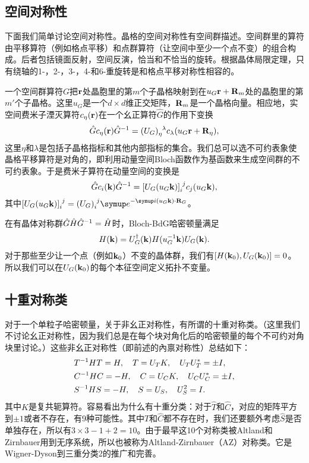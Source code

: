 \subsection{空间对称性}
下面我们简单讨论空间对称性。晶格的空间对称性有空间群描述。空间群里的算符由平移算符（例如格点平移）和点群算符（让空间中至少一个点不变）的组合构成。后者包括镜面反射，空间反演，恰当和不恰当的旋转。根据晶体局限定理，只有绕轴的1-，2-，3-，4-和6-重旋转是和格点平移对称性相容的。

一个空间群算符$G$把$\vb r$处晶胞里的第$m$个子晶格映射到在$u_G \vb r+\vb R_m$处的晶胞里的第$m'$个子晶格。这里$u_G$是一个$d\times d$维正交矩阵，$\vb R_m$是一个晶格向量。相应地，实空间费米子湮灭算符$c_\eta(\vb r)$在一个幺正算符$\hat G$的作用下变换
\begin{equation}
  \hat G c_\eta (\vb r) \hat G\inv = (U_G)\indices{_\eta^\lambda}c_\lambda(u_G \vb r+\vb R_\eta),
\end{equation}
这里$\eta$和$\lambda$是包括子晶格指标和其他内部指标的集合。我们总可以选不可约表象使晶格平移算符是对角的，即利用动量空间Bloch函数作为基函数来生成空间群的不可约表象。于是费米子算符在动量空间的变换是
\begin{equation}
  \hat G c_i(\vb k) \hat G\inv = [U_G(u_G\vb k)]\indices{_i^j}c_j(u_G \vb k),
\end{equation}
其中$[U_G(u_G\vb k)]\indices{_i^j}=(U_G)\indices{_i^j}\eu^{-\iu (u_G\vb k)\cdot \vb R_G}$。

在有晶体对称群$\hat G \hat H \hat G^{-1} = \hat H$时，Bloch-BdG哈密顿量满足
\begin{equation}
  H(\vb k) = U_G^\dagger (\vb k) H(u_G^{-1} \vb k) U_G (\vb k).
\end{equation}
对于那些至少让一个点（例如$\vb k_0$）不变的晶体群，我们有$[H(\vb k_0),U_G(\vb k_0)]=0$。所以我们可以在$U_G(\vb k_0)$的每个本征空间定义拓扑不变量。

\subsection{十重对称类}
对于一个单粒子哈密顿量，关于非幺正对称性，有所谓的十重对称类。（这里我们不讨论幺正对称性，因为我们总是在每个块对角化后的哈密顿量的每个不可约对角块里讨论。）这些非幺正对称性（即前述的內禀对称性）总结如下：
\begin{subequations}
    \begin{align}
        &T^{-1} H T = H,\quad T=U_TK,\quad U_TU_T^* = \pm I,\\
        &C^{-1} H C = - H,\quad C=U_C K,\quad U_CU_C^* = \pm I,\\
        &S^{-1} H S= -H ,\quad S=U_S,\quad U_S^2 =I.
    \end{align}
\end{subequations}
其中$K$是复共轭算符。容易看出为什么有十重分类：对于$\hat T$和$\hat C$，对应的矩阵平方到$\pm1$或者不存在，有9种可能性。其中$\hat T$和$\hat C$都不存在时，我们还要额外考虑$\hat S$是否单独存在，所以有$3\times 3 -1+2=10$。由于最早这10个对称类被Altland和Zirnbauer用到无序系统\cite{Zirnbauer1996,Altland1997}，所以也被称为Altland-Zirnbauer（AZ）对称类。它是Wigner-Dyson到三重分类\cite{Dyson1962}2的推广和完善。


